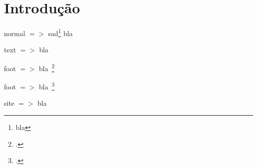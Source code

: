 \chapter{Introdução}
\pagestyle{fancy}

normal $=>$ sad\footnote{bla} bla~\cite[p. 51]{livroo}

text $=>$ bla~\textcite[p. 51]{livroo}

foot $=>$ bla~\footcite{livroo}

foot $=>$ bla~\footcite{sitee}

site $=>$ bla~\cite{sitee}

\lipsum
